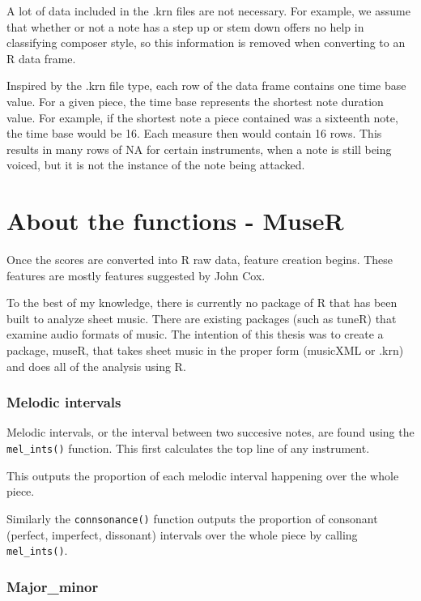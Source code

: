 \documentclass[12pt,twoside]{reedthesis}
\theoremstyle{definition}
\theoremstyle{definition}
\theoremstyle{definition}
\theoremstyle{remark}
\begin{document}
A lot of data included in the .krn files are not necessary. For example,
we assume that whether or not a note has a step up or stem down offers
no help in classifying composer style, so this information is removed
when converting to an R data frame.

Inspired by the .krn file type, each row of the data frame contains one
time base value. For a given piece, the time base represents the
shortest note duration value. For example, if the shortest note a piece
contained was a sixteenth note, the time base would be 16. Each measure
then would contain 16 rows. This results in many rows of NA for certain
instruments, when a note is still being voiced, but it is not the
instance of the note being attacked.

\section{About the functions - MuseR}\label{about-the-functions---muser}

Once the scores are converted into R raw data, feature creation begins.
These features are mostly features suggested by John Cox.

To the best of my knowledge, there is currently no package of R that has
been built to analyze sheet music. There are existing packages (such as
tuneR) that examine audio formats of music. The intention of this thesis
was to create a package, museR, that takes sheet music in the proper
form (musicXML or .krn) and does all of the analysis using R.

\subsubsection{Melodic intervals}\label{melodic-intervals}

Melodic intervals, or the interval between two succesive notes, are
found using the \texttt{mel\_ints()} function. This first calculates the
top line of any instrument.

This outputs the proportion of each melodic interval happening over the
whole piece.

Similarly the \texttt{connsonance()} function outputs the proportion of
consonant (perfect, imperfect, dissonant) intervals over the whole piece
by calling \texttt{mel\_ints()}.

\subsubsection{Major\_minor}\label{major_minor}
\end{document}
